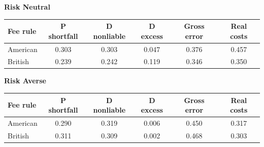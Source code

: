 \documentclass[10pt,border=5pt,varwidth=17cm]{standalone}
\begin{document}
\begingroup
\small
\setlength{\tabcolsep}{5pt}
\renewcommand{\arraystretch}{1.20}
\noindent\textbf{Risk Neutral}\par\smallskip
\noindent\begin{tabularx}{\linewidth}{@{}>{\raggedright\arraybackslash}Xccccc@{}}
\toprule
\textbf{Fee rule} & \textbf{P shortfall} & \textbf{D nonliable} & \textbf{D excess} & \textbf{Gross error} & \textbf{Real costs} \\
\midrule
American & 0.303 & 0.303 & 0.047 & 0.376 & 0.457 \\
British & 0.239 & 0.242 & 0.119 & 0.346 & 0.350 \\
\bottomrule\end{tabularx}\par\medskip
\noindent\textbf{Risk Averse}\par\smallskip
\noindent\begin{tabularx}{\linewidth}{@{}>{\raggedright\arraybackslash}Xccccc@{}}
\toprule
\textbf{Fee rule} & \textbf{P shortfall} & \textbf{D nonliable} & \textbf{D excess} & \textbf{Gross error} & \textbf{Real costs} \\
\midrule
American & 0.290 & 0.319 & 0.006 & 0.450 & 0.317 \\
British & 0.311 & 0.309 & 0.002 & 0.468 & 0.303 \\
\bottomrule\end{tabularx}\par\medskip
\endgroup
\end{document}
